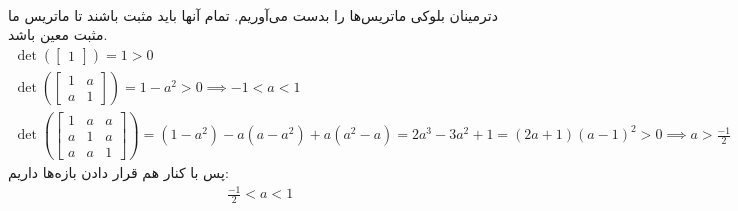 \\
دترمینان بلوکی ماتریس‌ها را بدست می‌آوریم. تمام آنها باید مثبت باشند تا ماتریس ما مثبت معین باشد.
\begin{gather*}
    \operatorname{det}(\begin{bmatrix}
        1
    \end{bmatrix}) = 1 > 0\\
    \operatorname{det}(\begin{bmatrix}
        1 & a\\
        a & 1
    \end{bmatrix}) = 1 - a^2 > 0 \implies -1 < a < 1\\
    \operatorname{det}(\begin{bmatrix}
        1 & a & a\\
        a & 1 & a\\
        a & a & 1
    \end{bmatrix}) = (1 - a^2) - a(a - a^2) + a(a^2 - a) = 2a^3 - 3a^2 + 1 = (2a+1)(a-1)^2 > 0
    \implies a > \frac{-1}{2}
\end{gather*}
پس با کنار هم قرار دادن بازه‌ها داریم:
\begin{gather*}
    \frac{-1}{2} < a < 1
\end{gather*}